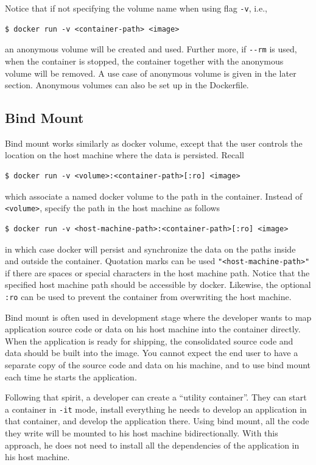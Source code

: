Notice that if not specifying the volume name when using flag \verb|-v|, i.e.,
\begin{lstlisting}
$ docker run -v <container-path> <image>
\end{lstlisting}
an anonymous volume will be created and used. Further more, if \verb|--rm| is used, when the container is stopped, the container together with the anonymous volume will be removed. A use case of anonymous volume is given in the later section. Anonymous volumes can also be set up in the Dockerfile.

\subsection{Bind Mount}

Bind mount works similarly as docker volume, except that the user controls the location on the host machine where the data is persisted. Recall
\begin{lstlisting}
$ docker run -v <volume>:<container-path>[:ro] <image>
\end{lstlisting}
which associate a named docker volume to the path in the container. Instead of \verb|<volume>|, specify the path in the host machine as follows
\begin{lstlisting}
$ docker run -v <host-machine-path>:<container-path>[:ro] <image>
\end{lstlisting}
in which case docker will persist and synchronize the data on the paths inside and outside the container. Quotation marks can be used \verb|"<host-machine-path>"| if there are spaces or special characters in the host machine path. Notice that the specified host machine path should be accessible by docker. Likewise, the optional \verb|:ro| can be used to prevent the container from overwriting the host machine.

Bind mount is often used in development stage where the developer wants to map application source code or data on his host machine into the container directly. When the application is ready for shipping, the consolidated source code and data should be built into the image. You cannot expect the end user to have a separate copy of the source code and data on his machine, and to use bind mount each time he starts the application. 

Following that spirit, a developer can create a ``utility container''. They can start a container in \verb|-it| mode, install everything he needs to develop an application in that container, and develop the application there. Using bind mount, all the code they write will be mounted to his host machine bidirectionally. With this approach, he does not need to install all the dependencies of the application in his host machine.

